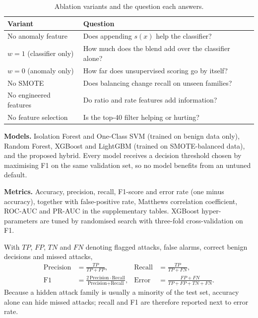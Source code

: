 \documentclass[conference]{IEEEtran}
\begin{document}
\begin{table}[!htb]
\caption{Ablation variants and the question each answers.}
\label{tab:abl}
\centering\footnotesize
\begin{tabular}{@{}p{2.3cm}p{5.0cm}@{}}
\hline
Variant & Question \\
\hline
No anomaly feature & Does appending $s(x)$ help the classifier? \\
$w=1$ (classifier only) & How much does the blend add over the classifier alone? \\
$w=0$ (anomaly only) & How far does unsupervised scoring go by itself? \\
No SMOTE & Does balancing change recall on unseen families? \\
No engineered features & Do ratio and rate features add information? \\
No feature selection & Is the top-40 filter helping or hurting? \\
\hline
\end{tabular}
\end{table}

\textbf{Models.} Isolation Forest and One-Class SVM (trained on benign data only), Random Forest, XGBoost and LightGBM (trained on SMOTE-balanced data), and the proposed hybrid. Every model receives a decision threshold chosen by maximising F1 on the same validation set, so no model benefits from an untuned default.

\textbf{Metrics.} Accuracy, precision, recall, F1-score and error rate (one minus accuracy), together with false-positive rate, Matthews correlation coefficient, ROC-AUC and PR-AUC in the supplementary tables. XGBoost hyper-parameters are tuned by randomised search with three-fold cross-validation on F1.

With $TP$, $FP$, $TN$ and $FN$ denoting flagged attacks, false alarms, correct benign decisions and missed attacks,
\begin{align}
\text{Precision}&=\frac{TP}{TP+FP}, & \text{Recall}&=\frac{TP}{TP+FN},\\
\text{F1}&=\frac{2\,\text{Precision}\cdot\text{Recall}}{\text{Precision}+\text{Recall}}, & \text{Error}&=\frac{FP+FN}{TP+FP+TN+FN}.
\end{align}
Because a hidden attack family is usually a minority of the test set, accuracy alone can hide missed attacks; recall and F1 are therefore reported next to error rate.
\end{document}
